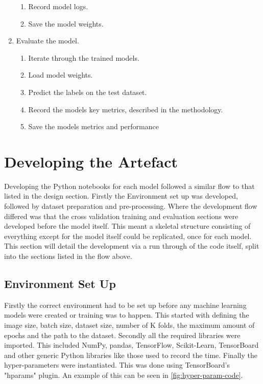 \begin{enumerate}
\begin{enumerate}
        \item Record model logs.
        \item Save the model weights.
    \end{enumerate}
    \item Evaluate the model.
    \begin{enumerate}
        \item Iterate through the trained models.
        \item Load model weights.
        \item Predict the labels on the test dataset.
        \item Record the models key metrics, described in the methodology.
        \item Save the models metrics and performance
    \end{enumerate}
\end{enumerate}

\section{Developing the Artefact}
Developing the Python notebooks for each model followed a similar flow to that listed in the design section. Firstly the Environment set up was developed, followed by dataset preparation and pre-processing. Where the development flow differed was that the cross validation training and evaluation sections were developed before the model itself. This meant a skeletal structure consisting of everything except for the model itself could be replicated, once for each model. This section will detail the development via a run through of the code itself, split into the sections listed in the flow above.

\subsection{Environment Set Up}
Firstly the correct environment had to be set up before any machine learning models were created or training was to happen. This started with defining the image size, batch size, dataset size, number of K folds, the maximum amount of epochs and the path to the dataset. Secondly all the required libraries were imported. This included NumPy, pandas, TensorFlow, Scikit-Learn, TensorBoard and other generic Python libraries like those used to record the time. Finally the hyper-parameters were instantiated. This was done using TensorBoard's "hparams" plugin. An example of this can be seen in \autoref{fig:hyper-param-code}.


